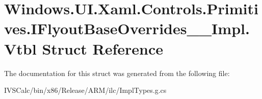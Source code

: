 \hypertarget{struct_windows_1_1_u_i_1_1_xaml_1_1_controls_1_1_primitives_1_1_i_flyout_base_overrides_____impl_1_1_vtbl}{}\section{Windows.\+U\+I.\+Xaml.\+Controls.\+Primitives.\+I\+Flyout\+Base\+Overrides\+\_\+\+\_\+\+Impl.\+Vtbl Struct Reference}
\label{struct_windows_1_1_u_i_1_1_xaml_1_1_controls_1_1_primitives_1_1_i_flyout_base_overrides_____impl_1_1_vtbl}


The documentation for this struct was generated from the following file\+:\begin{DoxyCompactItemize}
\item 
I\+V\+S\+Calc/bin/x86/\+Release/\+A\+R\+M/ilc/Impl\+Types.\+g.\+cs\end{DoxyCompactItemize}
